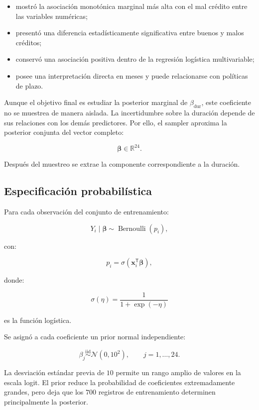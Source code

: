 \begin{itemize}
    \item mostró la asociación monotónica marginal más alta con el mal
    crédito entre las variables numéricas;

    \item presentó una diferencia estadísticamente significativa entre
    buenos y malos créditos;

    \item conservó una asociación positiva dentro de la regresión
    logística multivariable;

    \item posee una interpretación directa en meses y puede relacionarse
    con políticas de plazo.
\end{itemize}

Aunque el objetivo final es estudiar la posterior marginal de
\(\beta_{\mathrm{dur}}\), este coeficiente no se muestrea de manera
aislada. La incertidumbre sobre la duración depende de sus relaciones con
los demás predictores. Por ello, el sampler aproxima la posterior conjunta
del vector completo:

\[
\boldsymbol{\beta}
\in
\mathbb{R}^{24}.
\]

Después del muestreo se extrae la componente correspondiente a la
duración.

\subsection{Especificación probabilística}

Para cada observación del conjunto de entrenamiento:

\[
Y_i
\mid
\boldsymbol{\beta}
\sim
\operatorname{Bernoulli}(p_i),
\]

con:

\[
p_i
=
\sigma
\left(
    \mathbf{x}_i^{\mathsf{T}}\boldsymbol{\beta}
\right),
\]

donde:

\[
\sigma(\eta)
=
\frac{1}{1+\exp(-\eta)}
\]

es la función logística.

Se asignó a cada coeficiente un prior normal independiente:

\[
\beta_j
\overset{\mathrm{iid}}{\sim}
\mathcal{N}(0,10^2),
\qquad
j=1,\ldots,24.
\]

La desviación estándar previa de \(10\) permite un rango amplio de valores
en la escala logit. El prior reduce la probabilidad de coeficientes
extremadamente grandes, pero deja que los \(700\) registros de
entrenamiento determinen principalmente la posterior.

